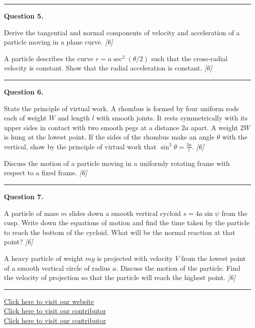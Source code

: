 \documentclass[11pt,a4paper]{article}
\newcommand{\pts}[1]{\hfill   \textit{[#1]}}
\begin{document}
\medskip\rule{\linewidth}{0.2pt}

\medskip


\noindent   \textbf{Question 5.}

\begin{parts}
  \item Derive the tangential and normal components of velocity and acceleration of a particle moving in a plane curve. \pts{6}
  \item A particle describes the curve $r = a \sec^2( \theta/2)$ such that the cross-radial velocity is constant. Show that the radial acceleration is constant. \pts{6}
\end{parts}

\medskip\rule{\linewidth}{0.2pt}

\medskip


\noindent   \textbf{Question 6.}

\begin{parts}
  \item State the principle of virtual work. A rhombus is formed by four uniform rods each of weight $W$ and length $l$ with smooth joints. It rests symmetrically with its upper sides in contact with two smooth pegs at a distance $2a$ apart. A weight $2W$ is hung at the lowest point. If the sides of the rhombus make an angle $ \theta$ with the vertical, show by the principle of virtual work that $\sin^3 \theta = \frac{3a}{l}$. \pts{6}
  \item Discuss the motion of a particle moving in a uniformly rotating frame with respect to a fixed frame. \pts{6}
\end{parts}

\medskip\rule{\linewidth}{0.2pt}

\medskip


\noindent   \textbf{Question 7.}

\begin{parts}
  \item A particle of mass $m$ slides down a smooth vertical cycloid $s = 4a\sin\psi$ from the cusp. Write down the equations of motion and find the time taken by the particle to reach the bottom of the cycloid. What will be the normal reaction at that point? \pts{6}
  \item A heavy particle of weight $mg$ is projected with velocity $V$ from the lowest point of a smooth vertical circle of radius $a$. Discuss the motion of the particle. Find the velocity of projection so that the particle will reach the highest point. \pts{6}
\end{parts}

\vfill
\rule{\linewidth}{0.4pt}

\begin{center}\small
  \href{https://bhu-exam.vercel.app/}{Click here to visit our website}\\[4pt]
  \href{https://me-aryan.vercel.app/}{Click here to visit our contributor}\\[4pt]
  \href{https://quashan-me.vercel.app/}{Click here to visit our contributor}
\end{center}
\end{document}
